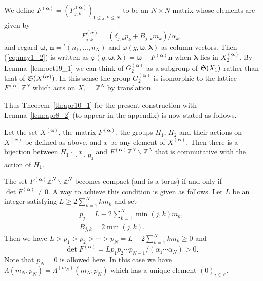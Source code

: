 \documentclass[pdftex]{sigma}
\newcommand{\Z}{{\mathbb Z}}
\newcommand\bom{\boldsymbol{\omega}}
\newcommand\bol{\boldsymbol{\lambda}}
\newcommand\boa{\boldsymbol{\alpha}}
\begin{document}
We def\/ine $F^{(\boa)} = (F^{(\boa)}_{j,k})_{1 \leq j,k \leq N}$ to be an $N \times N$ matrix whose elements are given by
\begin{equation}\label{eq:may15_1}
F^{(\boa)}_{j,k} = (\delta_{j,k} p_k + B_{j,k} m_k)/\alpha_k ,
\end{equation}
and regard $\bom$, $\boldsymbol{n} = {}^t (n_1,\ldots,n_N)$ and $\varphi(g,\bom,\bol)$ as column vectors.
Then (\ref{eq:may1_2}) is written as
$\varphi(g,\bom,\bol) = \bom + F^{(\boa)} \boldsymbol{n}$
when $\bol$ lies in $X_2^{(\boa)}$.
By Lemma~\ref{lem:oct19_1} we can
think of $G_2^{(\boa)}$ as a
subgroup of ${\frak S}(X_1)$ rather than that of ${\frak S}(X^{(\boa)})$.
In this sense the group $G_2^{(\boa)}$ is isomorphic to the lattice $F^{(\boa)} \Z^N$
which acts on $X_1 = \Z^N$ by translation.

Thus Theorem~\ref{th:apr10_1} for the present construction with Lemma~\ref{lem:apr8_2}
(to appear in the appendix)
is now stated as follows.
\begin{proposition}\label{prop:apr22_1}
Let the set $X^{(\boa)}$, the matrix $F^{(\boa)}$, the groups $H_1$, $H_2$ and their actions on $X^{(\boa)}$
be def\/ined as above, and
$x$ be any element of $X^{(\boa)}$.
Then there is a bijection between $H_1 \cdot [x]_{H_2}$ and $F^{(\boa)} \Z^N \backslash \Z^N$
that is commutative with the action of $H_1$.
\end{proposition}
The set $F^{(\boa)} \Z^N \backslash \Z^N$ becomes compact {(and is a torus)} if and only if $\det F^{(\boa)} \ne 0$.
A way to achieve this condition is given as follows.
Let $L$ be an integer satisfying $L \geq 2 \sum_{k=1}^N k m_k$ and set
\begin{gather}\label{eq:may15_2}
p_j = L - 2\sum_{k =1}^N \min(j,k)m_k,\\
B_{j,k} = 2 \min (j,k).\label{eq:may26_1}
\end{gather}
Then we have $L > p_1 > p_2 > \cdots > p_N = L - 2 \sum_{k=1}^N k m_k \geq 0$ and
\begin{equation*}
\det F^{(\boa)} = L p_1 p_2 \cdots p_{N-1}/(\alpha_1 \cdots \alpha_N) > 0.
\end{equation*}
Note that $p_N=0$ is allowed here.
In this case we have $\Lambda (m_N,p_N) = \Lambda^{(m_N)} (m_N,p_N)$ which has {a unique} element $(0)_{i \in \Z}$.
\end{document}

